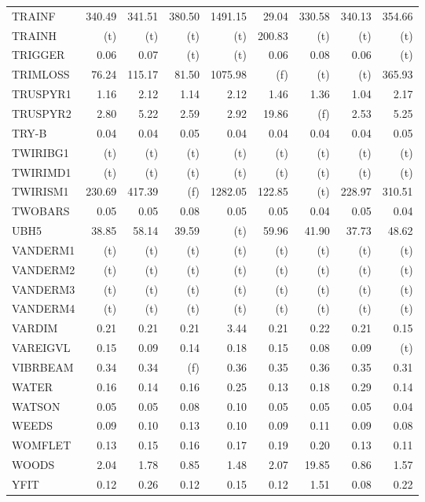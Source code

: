 \documentclass[11pt,twoside]{article}
\begin{document}
{\begin{longtable}[c]{|l|r|r|r|r|r|r|r|r|}
TRAINF & 340.49 & 341.51 & 380.50 & 1491.15 & 29.04 & 330.58 & 340.13 & 354.66 \\
TRAINH & (t) & (t) & (t) & (t) & 200.83 & (t) & (t) & (t) \\
TRIGGER & 0.06 & 0.07 & (t) & (t) & 0.06 & 0.08 & 0.06 & (t) \\
TRIMLOSS & 76.24 & 115.17 & 81.50 & 1075.98 & (f) & (t) & (t) & 365.93 \\
TRUSPYR1 & 1.16 & 2.12 & 1.14 & 2.12 & 1.46 & 1.36 & 1.04 & 2.17 \\
TRUSPYR2 & 2.80 & 5.22 & 2.59 & 2.92 & 19.86 & (f) & 2.53 & 5.25 \\
TRY-B & 0.04 & 0.04 & 0.05 & 0.04 & 0.04 & 0.04 & 0.04 & 0.05 \\
TWIRIBG1 & (t) & (t) & (t) & (t) & (t) & (t) & (t) & (t) \\
TWIRIMD1 & (t) & (t) & (t) & (t) & (t) & (t) & (t) & (t) \\
TWIRISM1 & 230.69 & 417.39 & (f) & 1282.05 & 122.85 & (t) & 228.97 & 310.51 \\
TWOBARS & 0.05 & 0.05 & 0.08 & 0.05 & 0.05 & 0.04 & 0.05 & 0.04 \\
UBH5 & 38.85 & 58.14 & 39.59 & (t) & 59.96 & 41.90 & 37.73 & 48.62 \\
VANDERM1 & (t) & (t) & (t) & (t) & (t) & (t) & (t) & (t) \\
VANDERM2 & (t) & (t) & (t) & (t) & (t) & (t) & (t) & (t) \\
VANDERM3 & (t) & (t) & (t) & (t) & (t) & (t) & (t) & (t) \\
VANDERM4 & (t) & (t) & (t) & (t) & (t) & (t) & (t) & (t) \\
VARDIM & 0.21 & 0.21 & 0.21 & 3.44 & 0.21 & 0.22 & 0.21 & 0.15 \\
VAREIGVL & 0.15 & 0.09 & 0.14 & 0.18 & 0.15 & 0.08 & 0.09 & (t) \\
VIBRBEAM & 0.34 & 0.34 & (f) & 0.36 & 0.35 & 0.36 & 0.35 & 0.31 \\
WATER & 0.16 & 0.14 & 0.16 & 0.25 & 0.13 & 0.18 & 0.29 & 0.14 \\
WATSON & 0.05 & 0.05 & 0.08 & 0.10 & 0.05 & 0.05 & 0.05 & 0.04 \\
WEEDS & 0.09 & 0.10 & 0.13 & 0.10 & 0.09 & 0.11 & 0.09 & 0.08 \\
WOMFLET & 0.13 & 0.15 & 0.16 & 0.17 & 0.19 & 0.20 & 0.13 & 0.11 \\
WOODS & 2.04 & 1.78 & 0.85 & 1.48 & 2.07 & 19.85 & 0.86 & 1.57 \\
YFIT & 0.12 & 0.26 & 0.12 & 0.15 & 0.12 & 1.51 & 0.08 & 0.22 \\

\end{longtable}}
\end{document}
